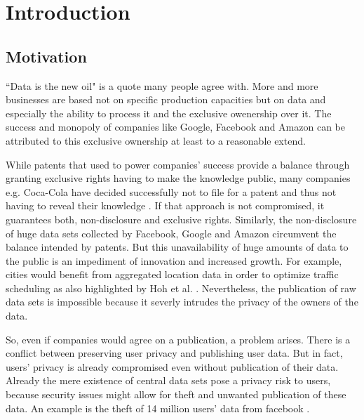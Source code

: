 
\chapter{Introduction}\label{chapter:introduction}
\section{Motivation}

“Data is the new oil" \parencite{data-is-the-new-oil, data-is-the-new-oil2} is a quote many people agree with. More and more businesses are based not on specific production capacities but on data and especially the ability to process it and the exclusive owenership over it. The success and monopoly of companies like Google, Facebook and Amazon can be attributed to this exclusive ownership at least to a reasonable extend.

While patents that used to power companies' success provide a balance through granting exclusive rights having to make the knowledge public, many companies e.g. Coca-Cola have decided successfully not to file for a patent and thus not having to reveal their knowledge \parencite{coca-cola}. If that approach is not compromised, it guarantees both, non-disclosure and  exclusive rights. Similarly, the non-disclosure of huge data sets collected by Facebook, Google and Amazon circumvent the balance intended by patents. But this unavailability of huge amounts of data to the public is an impediment of innovation and increased growth. For example, cities would benefit from aggregated location data in order to optimize traffic scheduling as also highlighted by Hoh et al. \parencite{hoh2005protecting}.
Nevertheless, the publication of raw data sets is impossible because it severly intrudes the privacy of the owners of the data.

So, even if companies would agree on a publication, a problem arises.
There is a conflict between preserving user privacy and publishing user data.
But in fact, users' privacy is already compromised even without publication of their data. Already the mere existence of central data sets pose a privacy risk to users, because security issues might allow for theft and unwanted publication of these data.
An example is the theft of 14 million users' data from facebook \parencite{facebook}.


